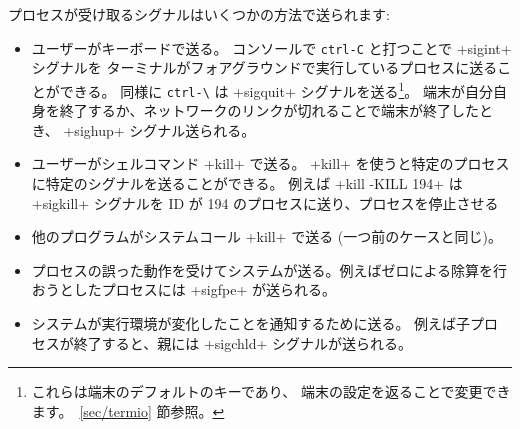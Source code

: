 プロセスが受け取るシグナルはいくつかの方法で送られます:
%
\begin{itemize}

\item ユーザーがキーボードで送る。
  コンソールで \verb'ctrl-C' と打つことで \ml+sigint+ シグナルを
  ターミナルがフォアグラウンドで実行しているプロセスに送ることができる。
  同様に \verb'ctrl-\' は \ml+sigquit+ シグナルを送る\footnote{これらは端末のデフォルトのキーであり、
    端末の設定を返ることで変更できます。~\ref {sec/termio} 節参照。}。
  端末が自分自身を終了するか、ネットワークのリンクが切れることで端末が終了したとき、 \ml+sighup+ シグナル送られる。

\item ユーザーがシェルコマンド \ml+kill+ で送る。
  \ml+kill+ を使うと特定のプロセスに特定のシグナルを送ることができる。
  例えば \ml+kill -KILL 194+ は \ml+sigkill+ シグナルを ID が 194 のプロセスに送り、プロセスを停止させる

\item 他のプログラムがシステムコール \ml+kill+ で送る (一つ前のケースと同じ)。

  \item プロセスの誤った動作を受けてシステムが送る。例えばゼロによる除算を行おうとしたプロセスには
  \ml+sigfpe+ が送られる。

  \item システムが実行環境が変化したことを通知するために送る。
  例えば子プロセスが終了すると、親には \ml+sigchld+ シグナルが送られる。

\end{itemize}


